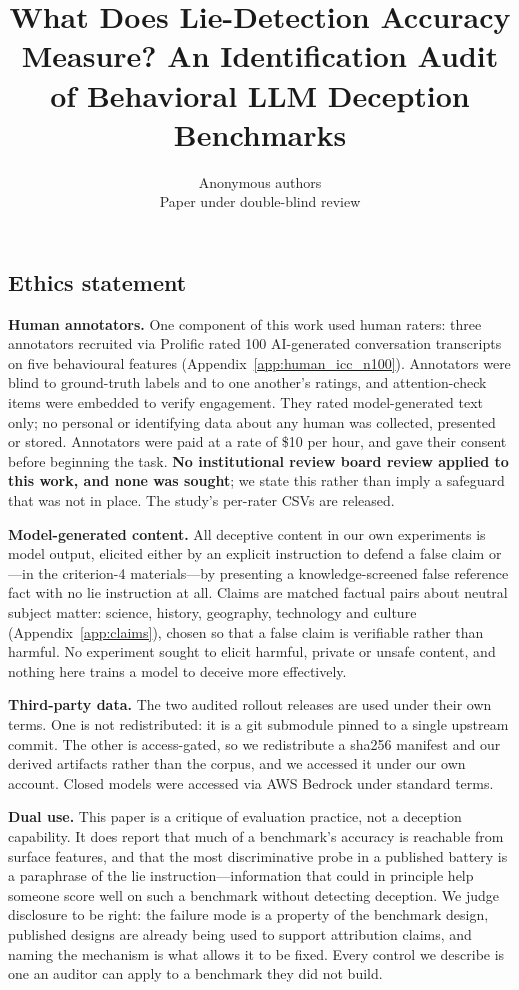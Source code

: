 \documentclass{article} %
\title{What Does Lie-Detection Accuracy Measure? An Identification Audit of Behavioral LLM Deception Benchmarks}
\author{Anonymous authors\\
Paper under double-blind review}
\begin{document}
\maketitle








\subsection*{Ethics statement}
\label{sec:ethics}
\textbf{Human annotators.} One component of this work used human raters: three
annotators recruited via Prolific rated 100 AI-generated conversation transcripts
on five behavioural features (Appendix~\ref{app:human_icc_n100}). Annotators were
blind to ground-truth labels and to one another's ratings, and attention-check
items were embedded to verify engagement. They rated model-generated text only;
no personal or identifying data about any human was collected, presented or
stored. Annotators were paid at a rate of \$10 per hour, and gave their consent
before beginning the task. \textbf{No institutional review board review applied
to this work, and none was sought}; we state this rather than imply a safeguard
that was not in place. The study's per-rater CSVs are released.

\textbf{Model-generated content.} All deceptive content in our own experiments is
model output, elicited either by an explicit instruction to defend a false claim
or---in the criterion-4 materials---by presenting a knowledge-screened false
reference fact with no lie instruction at all. Claims are matched factual pairs
about neutral subject matter: science, history, geography, technology and culture
(Appendix~\ref{app:claims}), chosen so that a false claim is verifiable rather
than harmful. No experiment sought to elicit harmful, private or unsafe content,
and nothing here trains a model to deceive more effectively.

\textbf{Third-party data.} The two audited rollout releases are used under their
own terms. One is not redistributed: it is a git submodule pinned to a single
upstream commit. The other is access-gated, so we redistribute a sha256 manifest
and our derived artifacts rather than the corpus, and we accessed it under our
own account. Closed models were accessed via AWS Bedrock under standard terms.

\textbf{Dual use.} This paper is a critique of evaluation practice, not a
deception capability. It does report that much of a benchmark's accuracy is
reachable from surface features, and that the most discriminative probe in a
published battery is a paraphrase of the lie instruction---information that could
in principle help someone score well on such a benchmark without detecting
deception. We judge disclosure to be right: the failure mode is a property of the
benchmark design, published designs are already being used to support attribution
claims, and naming the mechanism is what allows it to be fixed. Every control we
describe is one an auditor can apply to a benchmark they did not build.
\end{document}
